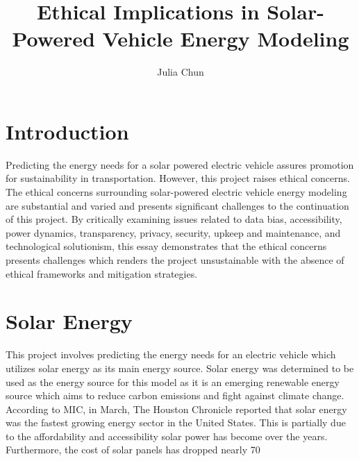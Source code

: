 \documentclass[10pt,twocolumn]{article}
\title{Ethical Implications in Solar-Powered Vehicle Energy Modeling}
\author{Julia Chun}
\affiliation{Occidental College}
\begin{document}
\maketitle

\section{Introduction}
Predicting the energy needs for a solar powered electric vehicle assures promotion for sustainability in transportation. However, this project raises ethical concerns. The ethical concerns surrounding solar-powered electric vehicle energy modeling are substantial and varied and presents significant challenges to the continuation of this project. By critically examining issues related to data bias, accessibility, power dynamics, transparency, privacy, security, upkeep and maintenance, and technological solutionism, this essay demonstrates that the ethical concerns presents challenges which renders the project unsustainable with the absence of ethical frameworks and mitigation strategies. 
\section{Solar Energy}
This project involves predicting the energy needs for an electric vehicle which utilizes solar energy as its main energy source. Solar energy was determined to be used as the energy source for this model as it is an emerging renewable energy source which aims to reduce carbon emissions and fight against climate change. According to MIC, in March, The Houston Chronicle reported that solar energy was the fastest growing energy sector in the United States. This is partially due to the affordability and accessibility solar power has become over the years. Furthermore, the cost of solar panels has dropped nearly 70%
\end{document}

